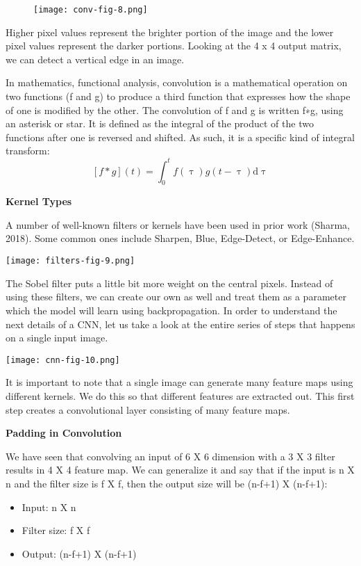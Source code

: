 \begin{figure}
  \texttt{[image: conv-fig-8.png]}
\end{figure}

Higher pixel values represent the brighter portion of the image and the lower pixel values represent the darker portions. Looking at the 4 x 4 output matrix, we can detect a vertical edge in an image.
\par
In mathematics, functional analysis,  convolution is a mathematical operation on two functions (f and g) to produce a third function that expresses how the shape of one is modified by the other. The convolution of f and g is written f∗g, using an asterisk or star. It is defined as the integral of the product of the two functions after one is reversed and shifted. As such, it is a specific kind of integral transform:
$$ [f*g](t) = \int_{0}^{t} f(\uptau) g(t - \uptau) \mathrm{d} \uptau $$


\begin{flushleft}
  \textbf{Kernel Types}
\end{flushleft}

A number of well-known filters or kernels have been used in prior work (Sharma, 2018). Some common ones include Sharpen, Blue, Edge-Detect, or Edge-Enhance.

\texttt{[image: filters-fig-9.png]}

The Sobel filter puts a little bit more weight on the central pixels. Instead of using these filters, we can create our own as well and treat them as a parameter which the model will learn using backpropagation. In order to understand the next details of a CNN, let us take a look at the entire series of steps that happens on a single input image.
\par
\texttt{[image: cnn-fig-10.png]}

It is important to note that a single image can generate many feature maps using different kernels. We do this so that different features are extracted out. This first step creates a convolutional layer consisting of many feature maps.
\par
\begin{flushleft}
  \textbf{Padding in Convolution}
\end{flushleft}

We have seen that convolving an input of 6 X 6 dimension with a 3 X 3 filter results in 4 X 4 feature map. We can generalize it and say that if the input is n X n and the filter size is f X f, then the output size will be (n-f+1) X (n-f+1):
\par
\begin{itemize}
  \item Input: n X n
  \item Filter size: f X f
  \item Output: (n-f+1) X (n-f+1)
\end{itemize}


